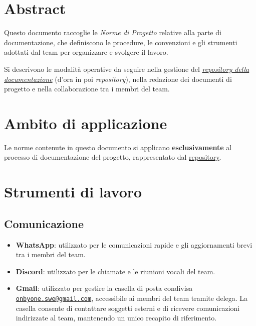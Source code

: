 \documentclass[11pt, a4paper]{article}
\begin{document}
\hypersetup{linkcolor=black}
\tableofcontents
{}
\newpage

\section{Abstract}
Questo documento raccoglie le \textit{Norme di Progetto} relative alla parte di documentazione, che definiscono le procedure, le convenzioni e gli strumenti adottati dal team per organizzare e svolgere il lavoro.

Si descrivono le modalità operative da seguire nella gestione del \href{https://github.com/On-By-One-Team/On-By-One.github.io}{\textit{repository della documentazione}} (d'ora in poi \textit{repository}), nella redazione dei documenti di progetto e nella collaborazione tra i membri del team.

\section{Ambito di applicazione}

Le norme contenute in questo documento si applicano \textbf{esclusivamente} al processo di documentazione del progetto, rappresentato dal \href{https://github.com/On-By-One-Team/On-By-One.github.io}{repository}.

\section{Strumenti di lavoro}

\subsection{Comunicazione}
\begin{itemize}
    \item \textbf{WhatsApp}: utilizzato per le comunicazioni rapide e gli aggiornamenti brevi tra i membri del team.
    \item \textbf{Discord}: utilizzato per le chiamate e le riunioni vocali del team.
    \item \textbf{Gmail}: utilizzato per gestire la casella di posta condivisa \href{mailto:onbyone.swe@gmail.com}{\texttt{onbyone.swe@gmail.com}}, accessibile ai membri del team tramite delega. La casella consente di contattare soggetti esterni e di ricevere comunicazioni indirizzate al team, mantenendo un unico recapito di riferimento.
\end{itemize}
\end{document}
